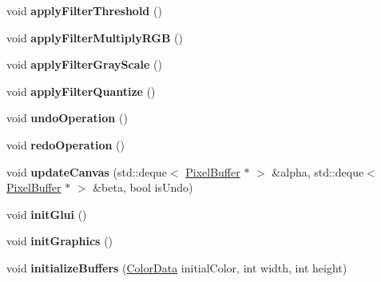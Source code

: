 \begin{DoxyCompactItemize}
\item 
\hypertarget{classMIAApp_aa3ad00c603fde42c8214c41c973f27f7}{void {\bfseries apply\-Filter\-Threshold} ()}\label{classMIAApp_aa3ad00c603fde42c8214c41c973f27f7}

\item 
\hypertarget{classMIAApp_adef6799fa8f0bcf49332285b5b861c93}{void {\bfseries apply\-Filter\-Multiply\-R\-G\-B} ()}\label{classMIAApp_adef6799fa8f0bcf49332285b5b861c93}

\item 
\hypertarget{classMIAApp_a774c68949c28f8287c8c6300274b3dd0}{void {\bfseries apply\-Filter\-Gray\-Scale} ()}\label{classMIAApp_a774c68949c28f8287c8c6300274b3dd0}

\item 
\hypertarget{classMIAApp_a708eab74083f7ae60c5d012544da628e}{void {\bfseries apply\-Filter\-Quantize} ()}\label{classMIAApp_a708eab74083f7ae60c5d012544da628e}

\item 
\hypertarget{classMIAApp_a9a16cbd589ab8ac59bedc4d7e49a5dc3}{void {\bfseries undo\-Operation} ()}\label{classMIAApp_a9a16cbd589ab8ac59bedc4d7e49a5dc3}

\item 
\hypertarget{classMIAApp_ab8ddeb7eb01eb8bf4cdb4207f8a21b1b}{void {\bfseries redo\-Operation} ()}\label{classMIAApp_ab8ddeb7eb01eb8bf4cdb4207f8a21b1b}

\item 
\hypertarget{classMIAApp_a1bb9e81c74e984224b38749f8df32800}{void {\bfseries update\-Canvas} (std\-::deque$<$ \hyperlink{classPixelBuffer}{Pixel\-Buffer} $\ast$ $>$ \&alpha, std\-::deque$<$ \hyperlink{classPixelBuffer}{Pixel\-Buffer} $\ast$ $>$ \&beta, bool is\-Undo)}\label{classMIAApp_a1bb9e81c74e984224b38749f8df32800}

\item 
\hypertarget{classMIAApp_a1ae83a224a7c642401788e2c17701ac2}{void {\bfseries init\-Glui} ()}\label{classMIAApp_a1ae83a224a7c642401788e2c17701ac2}

\item 
\hypertarget{classMIAApp_a0fea18478d7de16109386d4e93c3ebbf}{void {\bfseries init\-Graphics} ()}\label{classMIAApp_a0fea18478d7de16109386d4e93c3ebbf}

\item 
\hypertarget{classMIAApp_ac754b2ce1a9a5afe03822cca5345ac53}{void {\bfseries initialize\-Buffers} (\hyperlink{classColorData}{Color\-Data} initial\-Color, int width, int height)}\label{classMIAApp_ac754b2ce1a9a5afe03822cca5345ac53}


\end{DoxyCompactItemize}
